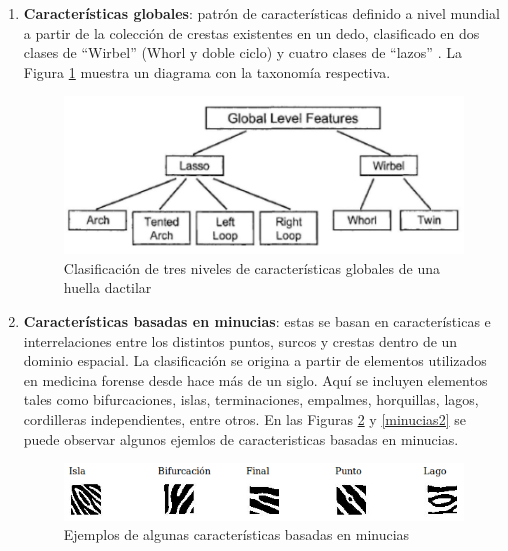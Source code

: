 \begin{enumerate}
	\item \textbf{Características globales}: patrón de características definido a nivel mundial a partir de la colección de crestas existentes en un dedo, clasificado en dos clases de ``Wirbel'' (Whorl y doble ciclo) y cuatro clases de “lazos” \cite{Bal97}. La Figura \ref{clasifica} muestra un diagrama con la taxonomía respectiva.

\begin{figure}[H]
\centering
\includegraphics[scale= 0.45]{images/capitulo2/clasifica.png}
\caption{Clasificación de tres niveles de características globales de una huella dactilar}
\label{clasifica}
\end{figure}


\item\textbf{Características basadas en minucias}: estas  se basan en características e interrelaciones entre los distintos puntos, surcos y crestas dentro de un dominio espacial. La clasificación se origina a partir de elementos utilizados en medicina forense desde hace más de un siglo. Aquí se incluyen elementos tales como bifurcaciones, islas, terminaciones, empalmes, horquillas, lagos, cordilleras
independientes, entre otros.  En las Figuras \ref{minucias} y \ref{minucias2} se puede  observar algunos ejemlos de caracteristicas basadas en  minucias. 

\begin{figure}[H]
\centering
\includegraphics[scale= 0.8]{images/capitulo2/minucias.png}
\caption{Ejemplos de algunas características basadas en minucias}
\label{minucias}
\end{figure}




\end{enumerate}
